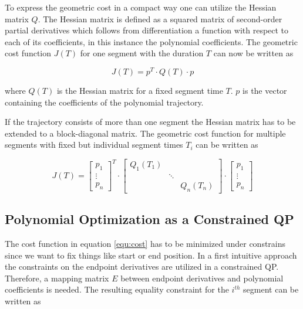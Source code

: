To express the geometric cost in a compact way one can utilize the Hessian matrix $Q$. The Hessian matrix is defined as a squared matrix of second-order partial derivatives which follows from differentiation a function with respect to each of its coefficients, in this instance the polynomial coefficients. The geometric cost function $J(T)$ for one segment with the duration $T$ can now be written as

\begin{equation}
J(T)  = p^T \cdot Q(T) \cdot p
\end{equation}

where $Q(T)$ is the Hessian matrix for a fixed segment time $T$. $p$ is the vector containing the coefficients of the polynomial trajectory. \newline

If the trajectory consists of more than one segment the Hessian matrix has to be extended to a block-diagonal matrix. The geometric cost function for multiple segments with fixed but individual segment times $T_i$ can be written as

\begin{equation}
J(T) =
\begin{bmatrix}
   p_1 \\
\vdots \\
  p_n
\end{bmatrix}^T
\cdot
\begin{bmatrix}
   Q_1(T_1) &  &  \\
    & \ddots &  \\
   & & Q_n(T_n)
\end{bmatrix} 
\cdot
\begin{bmatrix}
   p_1 \\
\vdots \\
  p_n
\end{bmatrix}
\label{equ:cost}
\end{equation}


\subsection{Polynomial Optimization as a Constrained QP}

The cost function in equation \ref{equ:cost} has to be minimized under constrains since we want to fix things like start or end position. In a first intuitive approach the constraints on the endpoint derivatives are utilized in a constrained QP. Therefore, a mapping matrix $E$ between endpoint derivatives and polynomial coefficients is needed. The resulting equality constraint for the $i^{th}$ segment can be written as

